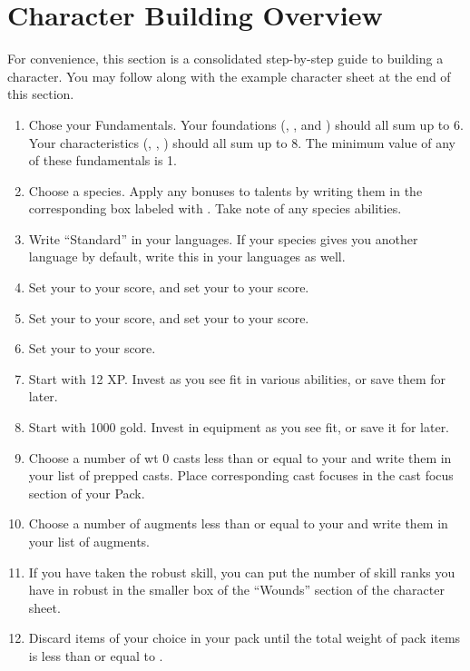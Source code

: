 \section{Character Building Overview}\label{sec:character_building_overview}

For convenience, this section is a consolidated step-by-step guide to building a character. You may follow along with the example character sheet at the end of this section.

\begin{enumerate}
	\item Chose your Fundamentals. Your foundations (, , and ) should all sum up to 6. Your characteristics (, , ) should all sum up to 8. The minimum value of any of these fundamentals is 1.
	\item Choose a species. Apply any bonuses to talents by writing them in the corresponding box labeled with \GRPdicebonus{}. Take note of any species abilities.
	\item Write ``Standard'' in your languages. If your species gives you another language by default, write this in your languages as well.
	\item Set your  to your  score, and set your  to your  score.
	\item Set your  to your  score, and set your  to your  score.
	\item Set your  to your  score.

	\item Start with 12 XP. Invest as you see fit in various abilities, or save them for later.
	\item Start with 1000 gold. Invest in equipment as you see fit, or save it for later.
	\item Choose a number of wt 0 casts less than or equal to your  and write them in your list of prepped casts. Place corresponding cast focuses in the cast focus section of your Pack.
	\item Choose a number of augments less than or equal to your  and write them in your list of augments.
	\item If you have taken the robust skill, you can put the number of skill ranks you have in robust in the smaller box of the ``Wounds'' section of the character sheet.
	\item Discard items of your choice in your pack until the total weight of pack items is less than or equal to .
\end{enumerate}


